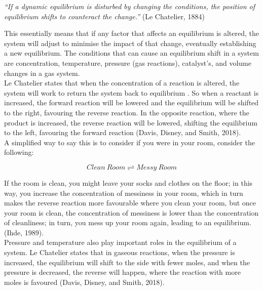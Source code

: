 \begin{center}
    \textit{“If a dynamic equilibrium is disturbed by changing the conditions, the position of equilibrium shifts to counteract the change.” } (Le Chatelier, 1884)
\end{center}

This essentially means that if any factor that affects an equilibrium is altered, the system will adjust to minimise the impact of that change, eventually establishing a new equilibrium.
 The conditions that can cause an equilibrium shift in a system are concentration, temperature, pressure (gas reactions), catalyst’s, and volume changes in a gas system. \\

Le Chatelier states that when the concentration of a reaction is altered, the system will work to return the system back to equilibrium	.
So when a reactant is increased, the forward reaction will be lowered and the equilibrium will be shifted to the right, favouring the reverse reaction. In the opposite reaction, where the product is increased, the reverse reaction will be lowered, shifting the equilibrium to the left, favouring the forward reaction (Davis, Disney, and Smith, 2018). \\

A simplified way to say this is to consider if you were in your room, consider the following: 

\begin{figure}[htp]
    \centering
    \[
        Clean \ Room \rightleftharpoons Messy \ Room
    \]
    \caption{}
    \label{fig:enter-label}
\end{figure}
	

If the room is clean, you might leave your socks and clothes on the floor; in this way, you increase the concentration of messiness in your room, which in turn makes the reverse reaction more favourable where you clean your room, but once your room is clean, the concentration of messiness is lower than the concentration of cleanliness; in turn, you mess up your room again, leading to an equilibrium. (Ihde, 1989). \\

Pressure and temperature also play important roles in the equilibrium of a system. Le Chatelier states that in gaseous reactions, when the pressure is increased, the equilibrium will shift to the side with fewer moles, and when the pressure is decreased, the reverse will happen, where the reaction with more moles is favoured (Davis, Disney, and Smith, 2018). \\


